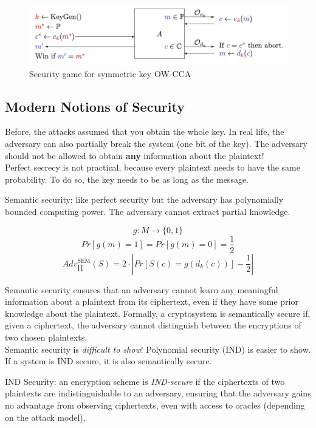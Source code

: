 \begin{figure}[h!]
    \centering
    \includegraphics[scale=0.5]{img/OWcca.png}
    \caption{Security game for symmetric key OW-CCA}
\end{figure}

\subsection{Modern Notions of Security}
Before, the attacks assumed that you obtain the whole key. In real life, the adversary can also partially break the system (one bit of the key). The adversary should not be allowed to obtain \textbf{any} information about the plaintext! \\

Perfect secrecy is not practical, because every plaintext needs to have the same probability. To do so, the key needs to be as long as the message.

\begin{defn}
Semantic security: like perfect security but the adversary has polynomially bounded computing power. The adversary cannot extract partial knowledge. 

\[g: M \rightarrow \{0,1\}\] 
\[Pr[g(m) = 1] = Pr[g(m) = 0] = \frac{1}{2}\]
\[ Adv_{\prod}^{\text{SEM}} (S) = 2 \cdot \left| Pr[S(c) = g(d_k(c))] - \frac{1}{2} \right| \]\end{defn}

Semantic security ensures that an adversary cannot learn any meaningful information about a plaintext from its ciphertext, even if they have some prior knowledge about the plaintext. Formally, a cryptosystem is semantically secure if, given a ciphertext, the adversary cannot distinguish between the encryptions of two chosen plaintexts. \\

Semantic security is \emph{difficult to show}! Polynomial security (IND) is easier to show. If a system is IND secure, it is also semantically secure.

\begin{defn}
IND Security: an encryption scheme is \emph{IND-secure} if the ciphertexts of two plaintexts are indistinguishable to an adversary, ensuring that the adversary gains no advantage from observing ciphertexts, even with access to oracles (depending on the attack model).
\end{defn}

